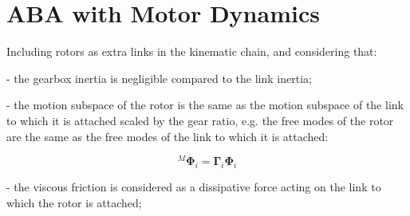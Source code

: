 \section{ABA with Motor Dynamics}

Including rotors as extra links in the kinematic chain, and considering that:

- the gearbox inertia is negligible compared to the link inertia;

- the motion subspace of the rotor is the same as the motion subspace of the link to which it is attached scaled by the gear ratio, e.g. the free modes of the rotor are the same as the free modes of the link to which it is attached:

\begin{equation}
    {} ^M \boldsymbol{\Phi} _i = \boldsymbol{\Gamma} _i \boldsymbol{\Phi} _i
\end{equation}

- the viscous friction is considered as a dissipative force acting on the link to which the rotor is attached;

